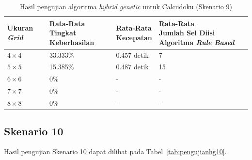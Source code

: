 \begin{table}
\centering
\captionsetup{justification=centering}
\caption[Hasil pengujian algoritma \textit{hybrid genetic} untuk Calcudoku (Skenario 9)]{Hasil pengujian algoritma \textit{hybrid genetic} untuk Calcudoku (Skenario 9)}
\begin{tabular}{| l | l | l | l |}
\hline
Ukuran \textit{Grid} & \makecell[c]{Rata-Rata \\ Tingkat Keberhasilan} & \makecell[c]{Rata-Rata \\ Kecepatan} & \makecell[c]{Rata-Rata \\ Jumlah Sel Diisi Algoritma \textit{Rule Based}} \\
\hline \hline
\begin{math}4 \times 4\end{math} & 33.333\% & 0.457 detik & 7 \\
\hline
\begin{math}5 \times 5\end{math} & 15.385\% & 0.487 detik & 15 \\
\hline
\begin{math}6 \times 6\end{math} & 0\% & - & - \\
\hline
\begin{math}7 \times 7\end{math} & 0\% & - & - \\
\hline
\begin{math}8 \times 8\end{math} & 0\% & - & - \\
\hline
\end{tabular}
\label{tab:pengujianhg9}
\end{table}

\subsection{Skenario 10}
\label{sec:skenario10}

Hasil pengujian Skenario 10 dapat dilihat pada Tabel~\ref{tab:pengujianhg10}.

